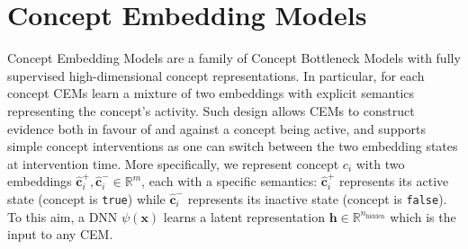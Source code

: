 %
%

\section{Concept Embedding Models} \label{sec:cem}
Concept Embedding Models are a family of Concept Bottleneck Models with fully supervised high-dimensional concept representations. In particular, for each concept CEMs learn a mixture of two embeddings with explicit semantics representing the concept's activity. Such design allows CEMs to construct evidence both in favour of and against a concept being active, and supports simple concept interventions as one can switch between the two embedding states at intervention time.
%
%
More specifically, we represent concept $c_i$ with two embeddings $\hat{\textbf{c}}^+_i, \hat{\textbf{c}}^-_i \in \mathbb{R}^m$, each with a specific semantics: $\hat{\textbf{c}}^+_i$ represents its active state (concept is \texttt{true}) while $\hat{\textbf{c}}^-_i$ represents its inactive state (concept is \texttt{false}). To this aim, a DNN $\psi(\mathbf{x})$ learns a latent representation $\mathbf{h} \in \mathbb{R}^{n_\text{hidden}}$ which is the input to any CEM. 
